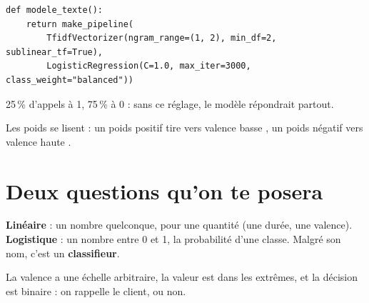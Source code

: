 \begin{stepbox}[title={4.3\quad Ton premier classifieur de texte}]
\begin{lstlisting}
def modele_texte():
    return make_pipeline(
        TfidfVectorizer(ngram_range=(1, 2), min_df=2, sublinear_tf=True),
        LogisticRegression(C=1.0, max_iter=3000, class_weight="balanced"))
\end{lstlisting}
\end{stepbox}

\begin{tcbraster}[raster columns=2, raster equal height, raster column skip=8pt]
\begin{kpibox}[title={\faBalanceScale\ \texttt{class\_weight="balanced"}}, unbreakable]
\small 25\,\% d'appels à 1, 75\,\% à 0 : sans ce réglage, le modèle répondrait  \fg{} partout.
\end{kpibox}
\begin{kpibox}[title={\faEye\ \texttt{mots\_marquants}}, unbreakable]
\small Les poids se lisent : un poids positif tire vers \og valence basse \fg{}, un poids négatif vers
\og valence haute \fg{}.
\end{kpibox}
\end{tcbraster}

\section{Deux questions qu'on te posera}

\begin{tcbraster}[raster columns=2, raster equal height, raster column skip=8pt]
\begin{kpibox}[title={\faQuestionCircle\ Logistique ou linéaire ?}, unbreakable]
\small \textbf{Linéaire} : un nombre quelconque, pour une quantité (une durée, une valence).\\
\textbf{Logistique} : un nombre entre 0 et 1, la probabilité d'une classe. Malgré son nom, c'est un
\textbf{classifieur}.
\end{kpibox}
\begin{kpibox}[title={\faQuestionCircle\ Pourquoi deux classes ?}, unbreakable]
\small La valence a une échelle arbitraire, la valeur est dans les extrêmes, et la décision est
binaire : on rappelle le client, ou non.
\end{kpibox}
\end{tcbraster}

